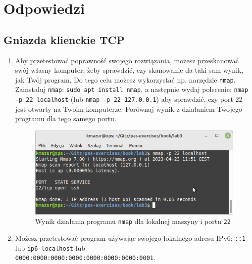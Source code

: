 \section{Odpowiedzi}

\subsection*{Gniazda klienckie TCP}
\begin{enumerate}[label=\textbf{3.\arabic*}]\setlength{\itemsep}{1em}
    \item    Aby przetestować poprawność swojego rozwiązania, możesz przeskanować swój własny komputer, żeby sprawdzić, czy skanowanie da taki sam wynik, jak Twój program. Do tego celu możesz wykorzystać np. narzędzie \texttt{nmap}. Zainstaluj \texttt{nmap}: \texttt{sudo apt install nmap}, a następnie wydaj polecenie: \texttt{nmap -p 22 localhost} (lub \texttt{nmap -p 22 127.0.0.1}) aby sprawdzić, czy port 22 jest otwarty na Twoim komputerze. Porównaj wynik z działaniem Twojego programu dla tego samego portu.  

\begin{figure}[h]
\caption{Wynik działania programu \texttt{nmap} dla lokalnej maszyny i portu \texttt{22}}
\centering
\includegraphics[scale=0.6]{./images/answers/ex3.1.png}
\end{figure}   

\item Możesz przetestować program używając swojego lokalnego adresu IPv6: \texttt{::1} lub \texttt{ip6-localhost} lub \\ \texttt{0000:0000:0000:0000:0000:0000:0000:0001}. 


\end{enumerate}
